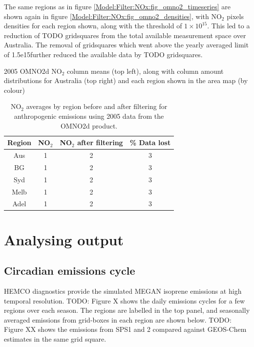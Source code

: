     The same regions as in figure \ref{Model:Filter:NOx:fig_omno2_timeseries} are shown again in figure \ref{Model:Filter:NOx:fig_omno2_densities}, with NO$_2$ pixels densities for each region shown, along with the threshold of $1 \times 10^{15}$\moleccm.
    This led to a reduction of TODO gridsquares from the total available measurement space over Australia.
    The removal of gridsquares which went above the yearly averaged limit of 1.5e15\moleccm further reduced the available data by TODO gridsquares.
    
    {2005 OMNO2d NO$_2$ column means (top left), along with column amount distributions for Australia (top right) and each region shown in the area map (by colour)}
    {\label{Model:Filter:NOx:fig_omno2_densities}}
    
    \begin{table}
      \caption{NO$_2$ averages by region before and after filtering for anthropogenic emissions using 2005 data from the OMNO2d product.}
      \begin{tabular}{ c c c c }
        \hline
        \textbf{Region} & \textbf{NO$_2$} & \textbf{NO$_2$ after filtering} & \textbf{\% Data lost} 
        \\ \hline
        Aus & 1 & 2 & 3 \\
        BG & 1 & 2 & 3 \\
        Syd & 1 & 2 & 3 \\
        Melb & 1 & 2 & 3 \\
        Adel & 1 & 2 & 3 \\
        \hline
      \end{tabular}
      \label{Model:Filter:NOx:tab_summary}
    \end{table}
    
    
\section{Analysing output}
\label{Model:Analysis}
  
    
    
  \subsection{Circadian emissions cycle}
    HEMCO diagnostics provide the simulated MEGAN isoprene emissions at high temporal resolution.
    TODO: Figure X shows the daily emissions cycles for a few regions over each season. 
    The regions are labelled in the top panel, and seasonally averaged emissions from grid-boxes in each region are shown below.
    TODO: Figure XX shows the emissions from SPS1 and 2 compared against GEOS-Chem estimates in the same grid square.
    
